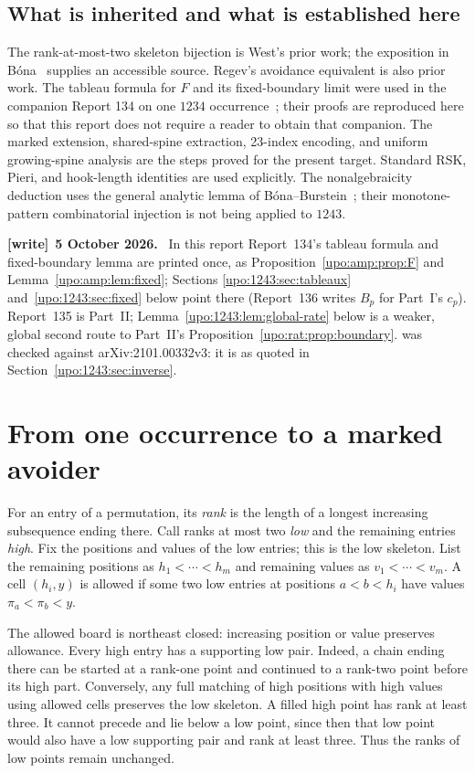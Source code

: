 \documentclass[11pt,letterpaper]{article}
\theoremstyle{remark}\newtheorem{remark}[theorem]{Remark}
\numberwithin{equation}{section}
\newenvironment{writenote}[1][]{\par\smallskip\begingroup\small
 \noindent\textbf{[write]}\if\relax\detokenize{#1}\relax\else~\textbf{#1.}\fi\ }%
 {\par\endgroup\smallskip}
\begin{document}
\subsection*{What is inherited and what is established here}
The rank-at-most-two skeleton bijection is West's prior work; the
exposition in B\'ona~\cite[Section 2, Lemma 2.2]{WestExposition} supplies
an accessible source. Regev's avoidance equivalent is also prior work.
The tableau formula for $F$ and its fixed-boundary limit were used in the
companion Report 134 on one $1234$ occurrence~\cite{R134}; their
proofs are reproduced here so that this report does not require a reader
to obtain that companion. The marked extension, shared-spine extraction,
23-index encoding, and uniform growing-spine analysis are the steps
proved for the present target. Standard RSK, Pieri, and hook-length
identities are used explicitly. The nonalgebraicity deduction uses the
general analytic lemma of B\'ona--Burstein~\cite[Lemma 6.3]{BB}; their
monotone-pattern combinatorial injection is not being applied to $1243$.
\begin{writenote}[5 October 2026]
In this report Report~134's tableau formula and fixed-boundary lemma are printed once, as Proposition~\ref{upo:amp:prop:F} and Lemma~\ref{upo:amp:lem:fixed}; Sections \ref{upo:1243:sec:tableaux} and~\ref{upo:1243:sec:fixed} below point there (Report~136 writes $B_p$ for Part~I's $c_p$). Report~135 is Part~II; Lemma~\ref{upo:1243:lem:global-rate} below is a weaker, global second route to Part~II's Proposition~\ref{upo:rat:prop:boundary}. \cite[Lemma 6.3]{BB} was checked against arXiv:2101.00332v3: it is as quoted in Section~\ref{upo:1243:sec:inverse}.
\end{writenote}

\section{From one occurrence to a marked avoider}\label{upo:1243:sec:marked}
For an entry of a permutation, its \emph{rank} is the length of a longest
increasing subsequence ending there. Call ranks at most two \emph{low}
and the remaining entries \emph{high}. Fix the positions and values of
the low entries; this is the low skeleton. List the remaining positions
as $h_1<\cdots<h_m$ and remaining values as $v_1<\cdots<v_m$.
A cell $(h_i,y)$ is allowed if some two low entries at positions $a<b<h_i$
have values $\pi_a<\pi_b<y$.

The allowed board is northeast closed: increasing position or value
preserves allowance. Every high entry has a supporting low pair. Indeed,
a chain ending there can be started at a rank-one point and continued to
a rank-two point before its high part. Conversely, any full matching of
high positions with high values using allowed cells preserves the low
skeleton. A filled high point has rank at least three. It cannot precede
and lie below a low point, since then that low point would also have a
low supporting pair and rank at least three. Thus the ranks of low
points remain unchanged.
\end{document}
